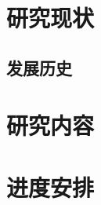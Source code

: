 \documentclass[AutoFakeBold]{article}
\begin{document}
\section{研究现状}
\lipsum[1]
\subsection{发展历史}
\lipsum[2]
\section{研究内容}
\lipsum[1-4]
\section{进度安排}
\lipsum[2]
\nocite{*}


\end{document}
